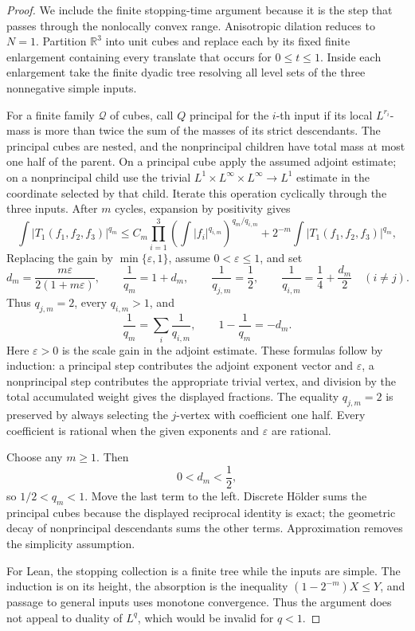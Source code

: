 \documentclass[11pt]{article}
\newcommand{\R}{\mathbb{R}}
\newcommand{\abs}[1]{\left|#1\right|}
\begin{document}
	\begin{proof}
		We include the finite stopping-time argument because it is the step that passes through the nonlocally convex range.  Anisotropic dilation reduces to \(N=1\).  Partition \(\R^3\) into unit cubes and replace each by its fixed finite enlargement containing every translate that occurs for \(0\leq t\leq1\).  Inside each enlargement take the finite dyadic tree resolving all level sets of the three nonnegative simple inputs.
		
		For a finite family \(\mathcal Q\) of cubes, call \(Q\) principal for the \(i\)-th input if its local \(L^{r_i}\)-mass is more than twice the sum of the masses of its strict descendants.  The principal cubes are nested, and the nonprincipal children have total mass at most one half of the parent.  On a principal cube apply the assumed adjoint estimate; on a nonprincipal child use the trivial \(L^1\times L^\infty\times L^\infty\to L^1\) estimate in the coordinate selected by that child.  Iterate this operation cyclically through the three inputs.  After \(m\) cycles, expansion by positivity gives
		\[
		\int \abs{T_1(f_1,f_2,f_3)}^{q_m}
		\leq
		C_m\prod_{i=1}^3
		\left(\int\abs{f_i}^{q_{i,m}}\right)^{q_m/q_{i,m}}
		+
		2^{-m}\int \abs{T_1(f_1,f_2,f_3)}^{q_m},
		\]
		Replacing the gain by \(\min\{\varepsilon,1\}\), assume \(0<\varepsilon\leq1\), and set
		\[
		d_m=\frac{m\varepsilon}{2(1+m\varepsilon)},\qquad
		\frac1{q_m}=1+d_m,\qquad
		\frac1{q_{j,m}}=\frac12,
		\qquad
		\frac1{q_{i,m}}=\frac14+\frac{d_m}{2}\quad(i\neq j).
		\]
		Thus \(q_{j,m}=2\), every \(q_{i,m}>1\), and
		\[
		\frac1{q_m}=\sum_i\frac1{q_{i,m}},
		\qquad
		1-\frac1{q_m}=-d_m.
		\]
		Here \(\varepsilon>0\) is the scale gain in the adjoint estimate.  These formulas follow by induction: a principal step contributes the adjoint exponent vector and \(\varepsilon\), a nonprincipal step contributes the appropriate trivial vertex, and division by the total accumulated weight gives the displayed fractions.  The equality \(q_{j,m}=2\) is preserved by always selecting the \(j\)-vertex with coefficient one half.  Every coefficient is rational when the given exponents and \(\varepsilon\) are rational.
		
		Choose any \(m\geq1\).  Then
		\[
		0<d_m<\frac12,
		\]
		so \(1/2<q_m<1\).  Move the last term to the left.  Discrete H\"older sums the principal cubes because the displayed reciprocal identity is exact; the geometric decay of nonprincipal descendants sums the other terms.  Approximation removes the simplicity assumption.
		
		For Lean, the stopping collection is a finite tree while the inputs are simple.  The induction is on its height, the absorption is the inequality
		\((1-2^{-m})X\leq Y\), and passage to general inputs uses monotone convergence.  Thus the argument does not appeal to duality of \(L^q\), which would be invalid for \(q<1\).
	\end{proof}
	
\end{document}
